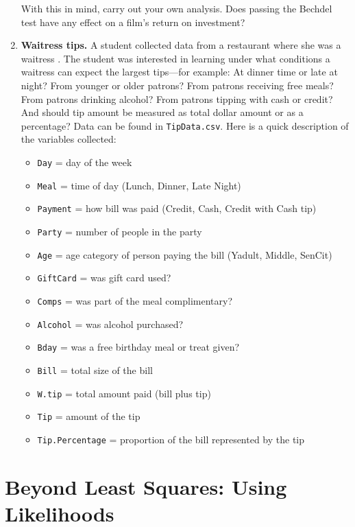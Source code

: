 \documentclass[
]{krantz}
\providecommand{\tightlist}{%
  \setlength{\itemsep}{0pt}\setlength{\parskip}{0pt}}
\begin{document}
\begin{enumerate}
  With this in mind, carry out your own analysis. Does passing the Bechdel test have any effect on a film's return on investment?
\item
  \textbf{Waitress tips.} A student collected data from a restaurant where she was a waitress \citep{Dahlquist2011}. The student was interested in learning under what conditions a waitress can expect the largest tips---for example: At dinner time or late at night? From younger or older patrons? From patrons receiving free meals? From patrons drinking alcohol? From patrons tipping with cash or credit? And should tip amount be measured as total dollar amount or as a percentage? Data can be found in \texttt{TipData.csv}. Here is a quick description of the variables collected:

  \begin{itemize}
  \tightlist
  \item
    \texttt{Day} = day of the week
  \item
    \texttt{Meal} = time of day (Lunch, Dinner, Late Night)
  \item
    \texttt{Payment} = how bill was paid (Credit, Cash, Credit with Cash tip)
  \item
    \texttt{Party} = number of people in the party
  \item
    \texttt{Age} = age category of person paying the bill (Yadult, Middle, SenCit)
  \item
    \texttt{GiftCard} = was gift card used?
  \item
    \texttt{Comps} = was part of the meal complimentary?
  \item
    \texttt{Alcohol} = was alcohol purchased?
  \item
    \texttt{Bday} = was a free birthday meal or treat given?
  \item
    \texttt{Bill} = total size of the bill
  \item
    \texttt{W.tip} = total amount paid (bill plus tip)
  \item
    \texttt{Tip} = amount of the tip
  \item
    \texttt{Tip.Percentage} = proportion of the bill represented by the tip
  \end{itemize}
\end{enumerate}

\hypertarget{ch-beyondmost}{%
\chapter{Beyond Least Squares: Using Likelihoods}\label{ch-beyondmost}}
\end{document}
